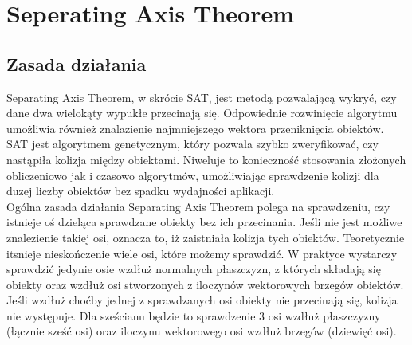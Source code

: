 \chapter{Seperating Axis Theorem}
\label{t:int}

\section{Zasada działania}
Separating Axis Theorem, w skrócie SAT, jest metodą pozwalającą wykryć, czy dane dwa wielokąty wypukłe przecinają się. Odpowiednie rozwinięcie algorytmu umożliwia również znalazienie najmniejszego wektora przeniknięcia obiektów.  SAT jest algorytmem genetycznym, który pozwala szybko zweryfikować, czy nastąpiła kolizja między obiektami. Niweluje to konieczność stosowania złożonych obliczeniowo jak i czasowo algorytmów, umożliwiając sprawdzenie kolizji dla duzej liczby obiektów bez spadku wydajności aplikacji.\\
Ogólna zasada działania Separating Axis Theorem polega na sprawdzeniu, czy istnieje oś dzieląca sprawdzane obiekty bez ich przecinania. Jeśli nie jest możliwe znalezienie takiej osi, oznacza to, iż zaistniała kolizja tych obiektów. Teoretycznie itsnieje nieskończenie wiele osi, które możemy sprawdzić. W praktyce wystarczy sprawdzić jedynie osie wzdłuż normalnych płaszczyzn, z których składają się obiekty oraz wzdłuż osi stworzonych z iloczynów wektorowych brzegów obiektów. Jeśli wzdłuż choćby jednej z sprawdzanych osi obiekty nie przecinają się, kolizja nie występuje. Dla sześcianu będzie to sprawdzenie 3 osi wzdłuż płaszczyzny (łącznie sześć osi) oraz iloczynu wektorowego osi wzdłuż brzegów (dziewięć osi). \\


